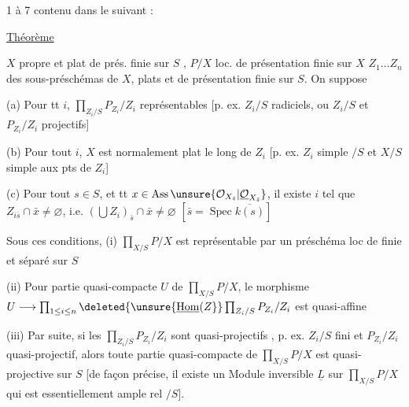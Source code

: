  1 à 7 contenu dans le suivant :

\uline{Théorème}

$X$ propre et plat de prés. finie sur $S$ , $P/X$ loc. de présentation finie sur $X$ $Z_1\ldots Z_n$ des sous-préschémas  de $X$, plats et de présentation finie sur $S$. On suppose

(a) Pour tt $i$, $\prod_{Z_i/S}P_{Z_i}/Z_i$ représentables [p. ex. $Z_i/S$ radiciels, ou $Z_i/S$ et $P_{Z_i}/Z_i$ projectifs]

(b) Pour tout $i$, $X$ est normalement plat le long de $Z_i$ [p. ex. $Z_i$ simple $/S$ et $X/S$ simple aux pts de $Z_i$]

(c) Pour tout $s\in S$, et tt $x\in\operatorname{Ass}\unsure{\mathcal O_{X_{\bar s}}|\underline{\mathcal O}_{X_{\bar s}}}$, il existe $i$ tel que $Z_{i\bar s}\cap\bar x\ne\varnothing$, i.e. $(\bigcup Z_i)_{\bar s}\cap\bar x\ne\varnothing$ $[\bar s=\operatorname{Spec}\overline{k(s)}]$

Sous ces conditions, (i) $\prod_{X/S}P/X$ est représentable par un préschéma loc de  finie et séparé sur $S$

 (ii)  Pour  partie  quasi-compacte $U$ de $\prod_{X/S}P/X$,  le morphisme $U\longrightarrow\prod_{1\leq i\leq n}\deleted{\unsure{\underline{\operatorname{Hom}}(Z}}\prod_{Z_i/S}P_{Z_i}/Z_i$ est quasi-affine

(iii) Par suite, si les $\prod_{Z_i/S}P_{Z_i}/Z_i$ sont quasi-projectifs , p. ex. $Z_i/S$ fini et $P_{Z_i}/Z_i$ quasi-projectif, alors toute partie quasi-compacte de $\prod_{X/S}P/X$ est quasi-projective sur $S$ [de façon précise, il existe un Module inversible $\underline L$ sur $\prod_{X/S}P/X$ qui est essentiellement ample rel $/S$].

